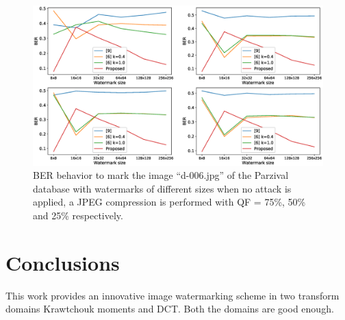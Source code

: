 \documentclass[runningheads]{llncs}
\begin{document}
\begin{figure}
	\begin{center}
		\includegraphics[width=1.1\textwidth]{BERwsizeParzival.eps}
		\caption{BER behavior to mark the image ``d-006.jpg'' of the Parzival database with watermarks of different sizes when no attack is applied, a JPEG compression is performed with QF = 75\%, 50\% and 25\% respectively.} \label{berwsizeParzival}
	\end{center}
\end{figure}

\section{Conclusions}
This work provides an innovative image watermarking scheme in two transform domains Krawtchouk moments and DCT. Both the domains are good enough.

%
%


%
\end{document}
